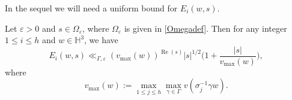 \documentclass[12pt,reqno]{amsart}
\numberwithin{equation}{section}
\renewcommand{\Re}{\operatorname{Re}}
\begin{document}
In the sequel we will need a uniform bound for $E_i(w, s)$. 

\begin{lemma}\label{lemma:Eis_pointwise_bound}
     Let $\varepsilon > 0$ and $s \in \Omega_{\varepsilon}$, where $\Omega_{\varepsilon}$ is given in \eqref{Omegadef}. Then for any integer $1\leq i \leq h$ and $w \in \mathbb{H}^3$, we have
    \begin{equation*}
        E_i(w,s) \ll_{\Gamma, \varepsilon} (v_\mathrm{max}(w))^{\Re(s)} |{s}|^{1/2} \Big(1  + \frac{|{s}|}{v_\mathrm{max}(w)} \Big),
    \end{equation*}
where 
\begin{equation*}
v_\mathrm{max}(w) := \max_{1\leq j\leq h} \max_{\gamma \in \Gamma} v(\sigma_j^{-1} \gamma w).
\end{equation*}
\end{lemma}
\end{document}
